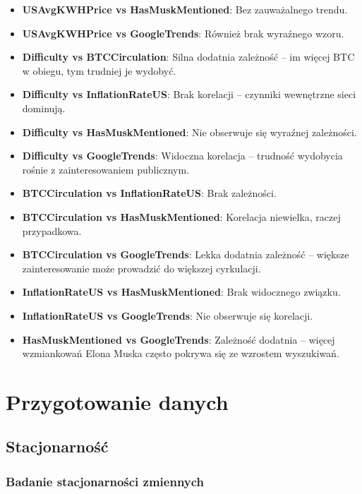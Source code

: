\documentclass[
  11pt,
]{article}
\begin{document}
\begin{itemize}
\item
  \textbf{USAvgKWHPrice vs HasMuskMentioned}: Bez zauważalnego trendu.
\item
  \textbf{USAvgKWHPrice vs GoogleTrends}: Również brak wyraźnego wzoru.
\item
  \textbf{Difficulty vs BTCCirculation}: Silna dodatnia zależność -- im
  więcej BTC w obiegu, tym trudniej je wydobyć.
\item
  \textbf{Difficulty vs InflationRateUS}: Brak korelacji -- czynniki
  wewnętrzne sieci dominują.
\item
  \textbf{Difficulty vs HasMuskMentioned}: Nie obserwuje się wyraźnej
  zależności.
\item
  \textbf{Difficulty vs GoogleTrends}: Widoczna korelacja -- trudność
  wydobycia rośnie z zainteresowaniem publicznym.
\item
  \textbf{BTCCirculation vs InflationRateUS}: Brak zależności.
\item
  \textbf{BTCCirculation vs HasMuskMentioned}: Korelacja niewielka,
  raczej przypadkowa.
\item
  \textbf{BTCCirculation vs GoogleTrends}: Lekka dodatnia zależność --
  większe zainteresowanie może prowadzić do większej cyrkulacji.
\item
  \textbf{InflationRateUS vs HasMuskMentioned}: Brak widocznego związku.
\item
  \textbf{InflationRateUS vs GoogleTrends}: Nie obserwuje się korelacji.
\item
  \textbf{HasMuskMentioned vs GoogleTrends}: Zależność dodatnia --
  więcej wzmiankowań Elona Muska często pokrywa się ze wzrostem
  wyszukiwań.
\end{itemize}

\pagebreak

\section{Przygotowanie danych}\label{przygotowanie-danych}

\subsection{Stacjonarność}\label{stacjonarnoux15bux107}

\subsubsection{Badanie stacjonarności
zmiennych}\label{badanie-stacjonarnoux15bci-zmiennych}
\end{document}
